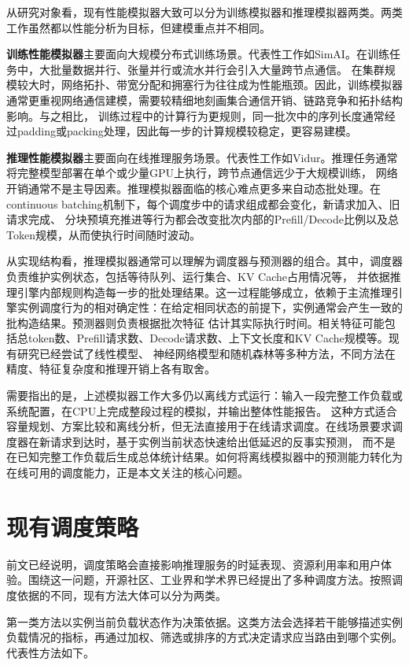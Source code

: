 从研究对象看，现有性能模拟器大致可以分为训练模拟器和推理模拟器两类。两类工作虽然都以性能分析为目标，但建模重点并不相同。

\textbf{训练性能模拟器}主要面向大规模分布式训练场景。代表性工作如SimAI。在训练任务中，大批量数据并行、张量并行或流水并行会引入大量跨节点通信。
在集群规模较大时，网络拓扑、带宽分配和拥塞行为往往成为性能瓶颈。因此，训练模拟器通常更重视网络通信建模，需要较精细地刻画集合通信开销、链路竞争和拓扑结构影响。与之相比，
训练过程中的计算行为更规则，同一批次中的序列长度通常经过padding或packing处理，因此每一步的计算规模较稳定，更容易建模。

\textbf{推理性能模拟器}主要面向在线推理服务场景。代表性工作如Vidur。推理任务通常将完整模型部署在单个或少量GPU上执行，跨节点通信远少于大规模训练，
网络开销通常不是主导因素。推理模拟器面临的核心难点更多来自动态批处理。在continuous batching机制下，每个调度步中的请求组成都会变化，新请求加入、旧请求完成、
分块预填充推进等行为都会改变批次内部的Prefill/Decode比例以及总Token规模，从而使执行时间随时波动。

从实现结构看，推理模拟器通常可以理解为调度器与预测器的组合。其中，调度器负责维护实例状态，包括等待队列、运行集合、KV Cache占用情况等，
并依据推理引擎内部规则构造每一步的批处理结果。这一过程能够成立，依赖于主流推理引擎实例调度行为的相对确定性：在给定相同状态的前提下，实例通常会产生一致的批构造结果。预测器则负责根据批次特征
估计其实际执行时间。相关特征可能包括总token数、Prefill请求数、Decode请求数、上下文长度和KV Cache规模等。现有研究已经尝试了线性模型、
神经网络模型和随机森林等多种方法，不同方法在精度、特征复杂度和推理开销上各有取舍。

需要指出的是，上述模拟器工作大多仍以离线方式运行：输入一段完整工作负载或系统配置，在CPU上完成整段过程的模拟，并输出整体性能报告。
这种方式适合容量规划、方案比较和离线分析，但无法直接用于在线请求调度。在线场景要求调度器在新请求到达时，基于实例当前状态快速给出低延迟的反事实预测，
而不是在已知完整工作负载后生成总体统计结果。如何将离线模拟器中的预测能力转化为在线可用的调度能力，正是本文关注的核心问题。

\section{现有调度策略}
前文已经说明，调度策略会直接影响推理服务的时延表现、资源利用率和用户体验。围绕这一问题，开源社区、工业界和学术界已经提出了多种调度方法。按照调度依据的不同，现有方法大体可以分为两类。

第一类方法以实例当前负载状态作为决策依据。这类方法会选择若干能够描述实例负载情况的指标，再通过加权、筛选或排序的方式决定请求应当路由到哪个实例。代表性方法如下。

